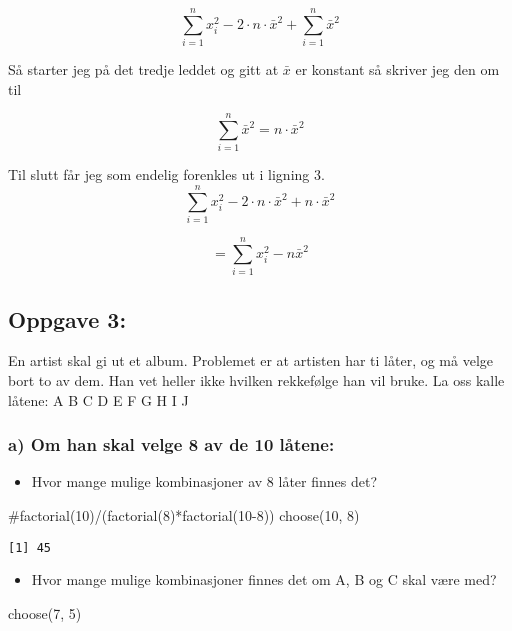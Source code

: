 \documentclass[
  12pt,
  a4paper,
  DIV=11,
  numbers=noendperiod]{scrartcl}
\newenvironment{Shaded}{\begin{snugshade}}{\end{snugshade}}
\newcommand{\CommentTok}[1]{\textcolor[rgb]{0.37,0.37,0.37}{#1}}
\newcommand{\DecValTok}[1]{\textcolor[rgb]{0.68,0.00,0.00}{#1}}
\newcommand{\FunctionTok}[1]{\textcolor[rgb]{0.28,0.35,0.67}{#1}}
\newcommand{\NormalTok}[1]{\textcolor[rgb]{0.00,0.23,0.31}{#1}}
\providecommand{\tightlist}{%
  \setlength{\itemsep}{0pt}\setlength{\parskip}{0pt}}\usepackage{longtable,booktabs,array}
\begin{document}
\[\sum_{i=1}^{n} x_i^2 -2 \cdot n \cdot \bar x^2 + \sum_{i=1}^{n} \bar x^2\]

Så starter jeg på det tredje leddet og gitt at \(\bar x\) er konstant så
skriver jeg den om til

\[\sum_{i=1}^{n} \bar x^2 = n \cdot \bar x^2\]

Til slutt får jeg som endelig forenkles ut i ligning 3.
\[\sum_{i=1}^{n} x_i^2 -2 \cdot n \cdot \bar x^2 + n \cdot \bar x^2\]

\[= \sum_{i=1}^{n} x_i^2 - n\bar x^2 \tag{3}\]

\subsection{Oppgave 3:}\label{oppgave-3}

En artist skal gi ut et album. Problemet er at artisten har ti låter, og
må velge bort to av dem. Han vet heller ikke hvilken rekkefølge han vil
bruke. La oss kalle låtene: A B C D E F G H I J

\subsubsection{a) Om han skal velge 8 av de 10
låtene:}\label{a-om-han-skal-velge-8-av-de-10-luxe5tene}

\begin{itemize}
\tightlist
\item
  Hvor mange mulige kombinasjoner av 8 låter finnes det?
\end{itemize}

\begin{Shaded}
\begin{Highlighting}[]
\CommentTok{\#factorial(10)/(factorial(8)*factorial(10{-}8))}
\FunctionTok{choose}\NormalTok{(}\DecValTok{10}\NormalTok{, }\DecValTok{8}\NormalTok{)}
\end{Highlighting}
\end{Shaded}

\begin{verbatim}
[1] 45
\end{verbatim}

\begin{itemize}
\tightlist
\item
  Hvor mange mulige kombinasjoner finnes det om A, B og C skal være med?
\end{itemize}

\begin{Shaded}
\begin{Highlighting}[]
\FunctionTok{choose}\NormalTok{(}\DecValTok{7}\NormalTok{, }\DecValTok{5}\NormalTok{)}
\end{Highlighting}
\end{Shaded}
\end{document}
